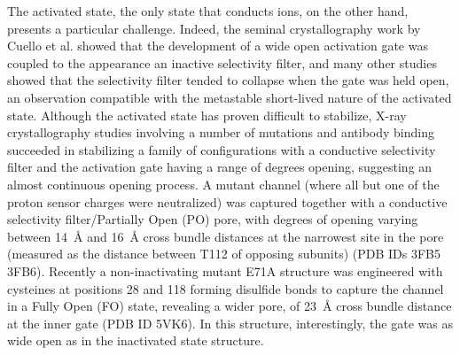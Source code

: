 \documentclass[%
 aip,
 amsmath,amssymb,
 preprint,%
]{revtex4-1}
\newcommand{\ca}{\ce{C_\alpha} }
\begin{document}
The activated state, the only state that conducts ions, on the other hand, presents a particular challenge. Indeed, the seminal crystallography work by Cuello et al. showed that the development of a wide open activation gate was coupled to the appearance an inactive selectivity filter, and many other studies showed that the selectivity filter tended to collapse when the gate was held open, an observation compatible with the metastable short-lived nature of the activated state.\cite{Cuello2010,Li2018,Furini2020} Although the activated state has proven difficult to stabilize, X-ray crystallography studies involving a number of mutations and antibody binding succeeded in stabilizing a family of configurations with a conductive selectivity filter and the activation gate having a range of degrees opening, suggesting an almost continuous opening process\cite{Cuello2010}. A mutant channel (where all but one of the proton sensor charges were neutralized) was captured together with a conductive selectivity filter/Partially Open (PO) pore, with degrees of opening varying between \SI{14}{\angstrom} and \SI{16}{\angstrom} cross bundle distances at the narrowest site in the pore (measured as the distance between T112 \ca of opposing subunits) (PDB IDs 3FB5 3FB6)\cite{Cuello2010}. Recently a non-inactivating mutant E71A structure was engineered with cysteines at positions 28 and 118 forming disulfide bonds to capture the channel in a Fully Open (FO) state, revealing a wider pore, of \SI{23}{\angstrom} cross bundle distance at the inner gate (PDB ID 5VK6). In this structure, interestingly, the gate was as wide open as in the inactivated state structure\cite{Cuello2017}.
 
\end{document}

